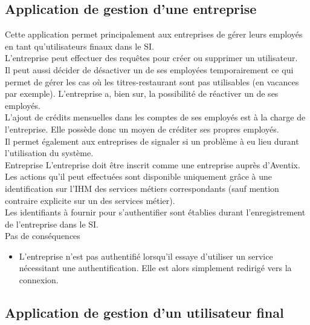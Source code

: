 \subsection{Application de gestion d'une entreprise}

\CUBref
{}%
{
  Cette application permet principalement aux entreprises de gérer leurs
  employés en tant qu'utilisateurs finaux dans le SI. \\

  L'entreprise peut effectuer des requêtes pour créer ou supprimer un
  utilisateur. \\

  Il peut aussi décider de désactiver un de ses employées temporairement ce qui
  permet de gérer les cas où les titres-restaurant sont pas utilisables (en
  vacances par exemple). L'entreprise a, bien sur, la possibilité de réactiver
  un de ses employés. \\

  L'ajout de crédits mensuelles dans les comptes de ses employés est à la
  charge de l'entreprise. Elle possède donc un moyen de créditer ses propres
  employés. \\

  Il permet également aux entreprises de signaler si un problème à eu lieu
  durant l'utilisation du système. \\
}
{Entreprise}
{
  L'entreprise doit être inscrit comme une entreprise auprès d'Aventix. \\

  Les actions qu'il peut effectuées sont disponible uniquement grâce à une
  identification sur l'IHM des services métiers correspondants (sauf mention
  contraire explicite sur un des services métier). \\

  Les identifiants à fournir pour s'authentifier sont établies durant
  l'enregistrement de l'entreprise dans le SI. \\
}
{Pas de conséquences}
{
  \begin{itemize}
    \item L'entreprise n'est pas authentifié lorsqu'il essaye d'utiliser un
      service nécessitant une authentification. Elle est alors simplement
      redirigé vers la connexion.
  \end{itemize}
}

\subsection{Application de gestion d'un utilisateur final}

